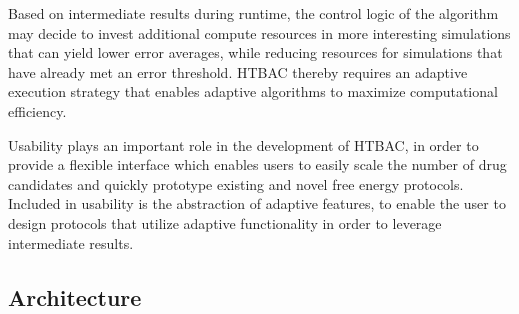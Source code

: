 


Based on intermediate results during runtime, the control logic of the
algorithm may decide to invest additional compute resources in more
interesting simulations that can yield lower error averages, while reducing
resources for simulations that have already met an error threshold.
HTBAC thereby requires an adaptive execution strategy 
 that enables 
adaptive algorithms to maximize computational efficiency. 

Usability plays an important role in the development of HTBAC, in order to
provide a flexible interface which enables users to easily scale the number
of drug candidates and quickly prototype existing and novel free energy
protocols. Included in usability is the abstraction of adaptive features, to 
enable the user to design protocols that utilize adaptive functionality in order
to leverage intermediate results.

\subsection{Architecture}

